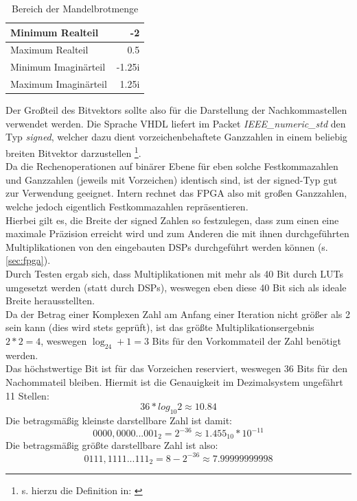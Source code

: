 \documentclass[a4paper,12pt,onesided]{report}
\begin{document}
\begin{table}[H]
	\centering
	\begin{tabular}{|l|r|}	
		\hline
		Minimum Realteil & -2 \\ \hline
		Maximum Realteil & 0.5 \\ \hline
		Minimum Imaginärteil & -1.25i \\ \hline
		Maximum Imaginärteil & 1.25i \\ \hline
	\end{tabular}
	\caption{Bereich der Mandelbrotmenge}
	\label{tab:minmaxmandel}
\end{table}

Der Großteil des Bitvektors sollte also für die Darstellung der Nachkommastellen verwendet werden.
Die Sprache VHDL liefert im Packet \textit{IEEE\_numeric\_std} den Typ \textit{signed}, welcher dazu dient vorzeichenbehaftete Ganzzahlen in einem beliebig breiten Bitvektor darzustellen \footnote{s. hierzu die Definition in: \cite{ieeeNumeric}}.\\
Da die Rechenoperationen auf binärer Ebene für eben solche Festkommazahlen und Ganzzahlen (jeweils mit Vorzeichen) identisch sind, ist der signed-Typ gut zur Verwendung geeignet.
Intern rechnet das FPGA also mit großen Ganzzahlen, welche jedoch eigentlich Festkommazahlen repräsentieren.\\
Hierbei gilt es, die Breite der signed Zahlen so festzulegen, dass zum einen eine maximale Präzision erreicht wird und zum Anderen die mit ihnen durchgeführten Multiplikationen von den eingebauten DSPs durchgeführt werden können (s. \autoref{sec:fpga}).\\
Durch Testen ergab sich, dass Multiplikationen mit mehr als 40 Bit durch LUTs umgesetzt werden (statt durch DSPs), weswegen eben diese 40 Bit sich als ideale Breite herausstellten.\\
Da der Betrag einer Komplexen Zahl am Anfang einer Iteration nicht größer als 2 sein kann (dies wird stets geprüft), ist das größte Multiplikationsergebnis $2*2=4$, weswegen $\log_24+1=3$ Bits für den Vorkommateil der Zahl benötigt werden.\\
Das höchstwertige Bit ist für das Vorzeichen reserviert, weswegen 36 Bits für den Nachommateil bleiben. Hiermit ist die Genauigkeit im Dezimalsystem ungefährt 11 Stellen:
\[36 * log_{10}2 \approx 10.84\]
Die betragsmäßig kleinste darstellbare Zahl ist damit:
\[0000,0000...001_2 = 2^{-36} \approx 1.455_{10}*10^{-11} \]
Die betragsmäßig größte darstellbare Zahl ist also:
\[0111,1111...111_2 = 8 - 2^{-36} \approx 7.99999999998 \]
\end{document}

